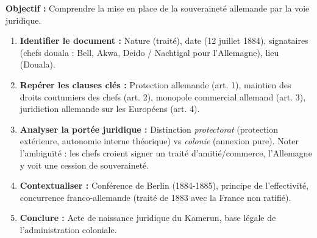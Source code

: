 \documentclass[11pt]{article}
\newcommand{\cle}[1]{{\popxbold\color{popdark}#1}}
\begin{document}
\begin{methode}
\textbf{Objectif :} Comprendre la mise en place de la souveraineté allemande par la voie juridique.
\begin{enumerate}
    \item \textbf{Identifier le document :} Nature (traité), date (12 juillet 1884), signataires (chefs douala : Bell, Akwa, Deido / Nachtigal pour l'Allemagne), lieu (Douala).
    \item \textbf{Repérer les clauses clés :} Protection allemande (art. 1), maintien des droits coutumiers des chefs (art. 2), monopole commercial allemand (art. 3), juridiction allemande sur les Européens (art. 4).
    \item \textbf{Analyser la portée juridique :} Distinction \emph{protectorat} (protection extérieure, autonomie interne théorique) vs \emph{colonie} (annexion pure). Noter l'ambiguïté : les chefs croient signer un traité d'amitié/commerce, l'Allemagne y voit une cession de souveraineté.
    \item \textbf{Contextualiser :} Conférence de Berlin (1884-1885), principe de l'effectivité, concurrence franco-allemande (traité de 1883 avec la France non ratifié).
    \item \textbf{Conclure :} Acte de naissance juridique du \cle{Kamerun}, base légale de l'administration coloniale.
\end{enumerate}
\end{methode}
\end{document}
